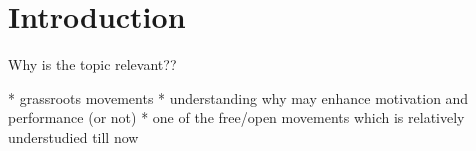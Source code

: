\section{Introduction}

Why is the topic relevant??

* grassroots movements
* understanding why may enhance motivation and performance (or not)
* one of the free/open movements which is relatively understudied till now

\begin{comment}
* Untersuchungsgegenstand
* Erkenntnisinteresse
* Forschungsstand
* Ergebnisse können/sollen angedeuten werden
\end{comment}


